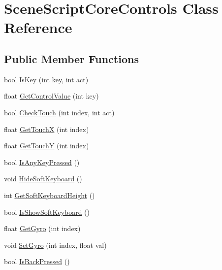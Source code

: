 \hypertarget{class_scene_script_core_controls}{}\section{Scene\+Script\+Core\+Controls Class Reference}
\label{class_scene_script_core_controls}
\subsection*{Public Member Functions}
\begin{DoxyCompactItemize}
\item 
bool \hyperlink{class_scene_script_core_controls_a03de5ad8036778c2612b28f0ba64a294}{Is\+Key} (int key, int act)
\item 
float \hyperlink{class_scene_script_core_controls_abb51e470e55c08401fa72e1777f2a9d1}{Get\+Control\+Value} (int key)
\item 
bool \hyperlink{class_scene_script_core_controls_a0ce07a8a3e36a6343710622becb41f35}{Check\+Touch} (int index, int act)
\item 
float \hyperlink{class_scene_script_core_controls_a0ac0c40ec17258c84aca35b34b980926}{Get\+TouchX} (int index)
\item 
float \hyperlink{class_scene_script_core_controls_a5a5ef38827d98c4939e878fc7f619b46}{Get\+TouchY} (int index)
\item 
bool \hyperlink{class_scene_script_core_controls_abf2bbf131c6ea480d1fc7d9a5a839c16}{Is\+Any\+Key\+Pressed} ()
\item 
void \hyperlink{class_scene_script_core_controls_a03b7be269b85a550e8da3a12e8075112}{Hide\+Soft\+Keyboard} ()
\item 
int \hyperlink{class_scene_script_core_controls_ae68999b85e8243ef03e08ed57833aaff}{Get\+Soft\+Keyboard\+Height} ()
\item 
bool \hyperlink{class_scene_script_core_controls_aee0343f695b42210bb91dcb81ac65b05}{Is\+Show\+Soft\+Keyboard} ()
\item 
float \hyperlink{class_scene_script_core_controls_a228ce5332a73c9203f97bc95c4bb8645}{Get\+Gyro} (int index)
\item 
void \hyperlink{class_scene_script_core_controls_afdd4326d6e6eb62b4306796588ccd559}{Set\+Gyro} (int index, float val)
\item 
bool \hyperlink{class_scene_script_core_controls_a03fdf8570dcc8be77c9c444956a122d3}{Is\+Back\+Pressed} ()
\end{DoxyCompactItemize}


